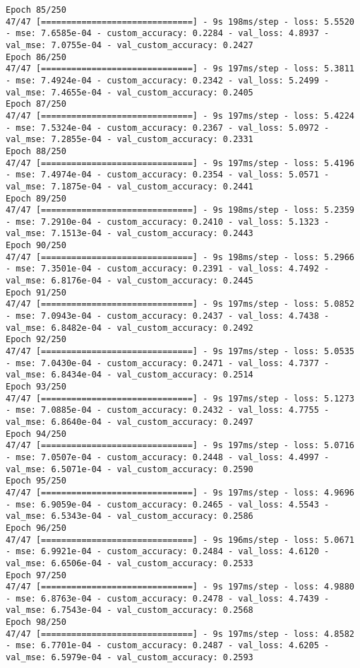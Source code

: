 \begin{lstlisting}
Epoch 85/250
47/47 [==============================] - 9s 198ms/step - loss: 5.5520 - mse: 7.6585e-04 - custom_accuracy: 0.2284 - val_loss: 4.8937 - val_mse: 7.0755e-04 - val_custom_accuracy: 0.2427
Epoch 86/250
47/47 [==============================] - 9s 197ms/step - loss: 5.3811 - mse: 7.4924e-04 - custom_accuracy: 0.2342 - val_loss: 5.2499 - val_mse: 7.4655e-04 - val_custom_accuracy: 0.2405
Epoch 87/250
47/47 [==============================] - 9s 197ms/step - loss: 5.4224 - mse: 7.5324e-04 - custom_accuracy: 0.2367 - val_loss: 5.0972 - val_mse: 7.2855e-04 - val_custom_accuracy: 0.2331
Epoch 88/250
47/47 [==============================] - 9s 197ms/step - loss: 5.4196 - mse: 7.4974e-04 - custom_accuracy: 0.2354 - val_loss: 5.0571 - val_mse: 7.1875e-04 - val_custom_accuracy: 0.2441
Epoch 89/250
47/47 [==============================] - 9s 198ms/step - loss: 5.2359 - mse: 7.2910e-04 - custom_accuracy: 0.2410 - val_loss: 5.1323 - val_mse: 7.1513e-04 - val_custom_accuracy: 0.2443
Epoch 90/250
47/47 [==============================] - 9s 198ms/step - loss: 5.2966 - mse: 7.3501e-04 - custom_accuracy: 0.2391 - val_loss: 4.7492 - val_mse: 6.8176e-04 - val_custom_accuracy: 0.2445
Epoch 91/250
47/47 [==============================] - 9s 197ms/step - loss: 5.0852 - mse: 7.0943e-04 - custom_accuracy: 0.2437 - val_loss: 4.7438 - val_mse: 6.8482e-04 - val_custom_accuracy: 0.2492
Epoch 92/250
47/47 [==============================] - 9s 197ms/step - loss: 5.0535 - mse: 7.0430e-04 - custom_accuracy: 0.2471 - val_loss: 4.7377 - val_mse: 6.8434e-04 - val_custom_accuracy: 0.2514
Epoch 93/250
47/47 [==============================] - 9s 197ms/step - loss: 5.1273 - mse: 7.0885e-04 - custom_accuracy: 0.2432 - val_loss: 4.7755 - val_mse: 6.8640e-04 - val_custom_accuracy: 0.2497
Epoch 94/250
47/47 [==============================] - 9s 197ms/step - loss: 5.0716 - mse: 7.0507e-04 - custom_accuracy: 0.2448 - val_loss: 4.4997 - val_mse: 6.5071e-04 - val_custom_accuracy: 0.2590
Epoch 95/250
47/47 [==============================] - 9s 197ms/step - loss: 4.9696 - mse: 6.9059e-04 - custom_accuracy: 0.2465 - val_loss: 4.5543 - val_mse: 6.5343e-04 - val_custom_accuracy: 0.2586
Epoch 96/250
47/47 [==============================] - 9s 196ms/step - loss: 5.0671 - mse: 6.9921e-04 - custom_accuracy: 0.2484 - val_loss: 4.6120 - val_mse: 6.6506e-04 - val_custom_accuracy: 0.2533
Epoch 97/250
47/47 [==============================] - 9s 197ms/step - loss: 4.9880 - mse: 6.8763e-04 - custom_accuracy: 0.2478 - val_loss: 4.7439 - val_mse: 6.7543e-04 - val_custom_accuracy: 0.2568
Epoch 98/250
47/47 [==============================] - 9s 197ms/step - loss: 4.8582 - mse: 6.7701e-04 - custom_accuracy: 0.2487 - val_loss: 4.6205 - val_mse: 6.5979e-04 - val_custom_accuracy: 0.2593

\end{lstlisting}

